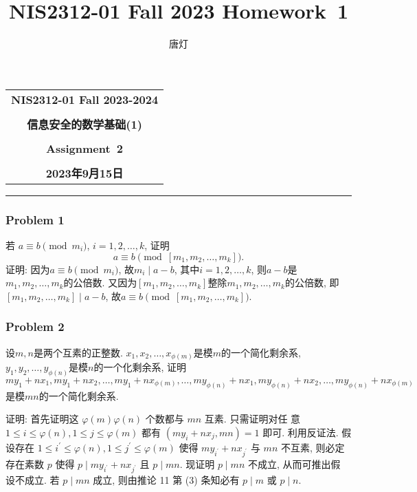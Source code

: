 \documentclass[a4paper,12pt]{ctexart}
\title{NIS2312-01 Fall 2023 Homework~1}
\author{唐灯}
\begin{document}
  \begin{center}

  \vspace{-0.3in}
  \begin{tabular}{c}
    \textbf{\Large NIS2312-01 Fall 2023-2024} \\
    \textbf{\Large  } \\
    \textbf{\Large  信息安全的数学基础(1)} \\
    \textbf{\Large  } \\
    \textbf{\Large  Assignment~2} \\
    \textbf{\Large  } \\
    \textbf{\Large 2023年9月15日} \\
  \end{tabular}
  \end{center}
  \noindent
  \rule{\linewidth}{0.4pt}
  
\subsubsection*{Problem 1}
  若 $a\equiv b\pmod{m_i}$, $i =1,2,\dots,k$, 证明
  \[a\equiv b\pmod{\left[ m_1,m_2,\dots,m_k \right]}.\]
  证明: 因为$a\equiv b\pmod{m_i}$, 故$m_i\mid a-b$, 其中$i=1,2,\dots,k$, 则$a-b$是$m_1,m_2,\dots,m_k$的公倍数. 又因为$\left[ m_1,m_2,\dots,m_k \right]$整除$m_1,m_2,\dots,m_k$的公倍数, 即$\left[ m_1,m_2,\dots,m_k \right]\mid a-b$, 故$a\equiv b\pmod{\left[ m_1,m_2,\dots,m_k \right]}$.
\subsubsection*{Problem 2} 
  设$m,n$是两个互素的正整数. $x_1, x_2,\dots , x_{\phi(m)}$是模$m$的一个简化剩余系, $y_1, y_2, \dots , y_{\phi(n)}$是模$n$的一个化剩余系, 证明$my_1 + nx_1, my_1 + nx_2, \dots , my_1 + nx_{\phi(m)}, \dots , my_{\phi(n)} + nx_1, my_{\phi(n)} + nx_2, \dots , my_{\phi(n)} + nx_{\phi(m)}$ 是模$mn$的一个简化剩余系.
  
  证明: 首先证明这 $\varphi(m) \varphi(n)$ 个数都与 $m n$ 互素. 只需证明对任 意 $1 \leq i \leq \varphi(n), 1 \leq j \leq \varphi(m)$ 都有 $\left(m y_i+n x_j, m n\right)=1$ 即可. 利用反证法. 假设存在 $1 \leq i^{\prime} \leq \varphi(n), 1 \leq j^{\prime} \leq \varphi(m)$ 使得 $m y_{i^{\prime}}+n x_{j^{\prime}}$ 与 $m n$ 不互素, 则必定存在素数 $p$ 使得 $p \mid m y_{i^{\prime}}+n x_{j^{\prime}}$ 且 $p \mid m n$. 现证明 $p \mid m n$ 不成立, 从而可推出假 设不成立. 若 $p \mid m n$ 成立, 则由推论 11 第 (3) 条知必有 $p \mid m$ 或 $p \mid n$. 
\end{document}
